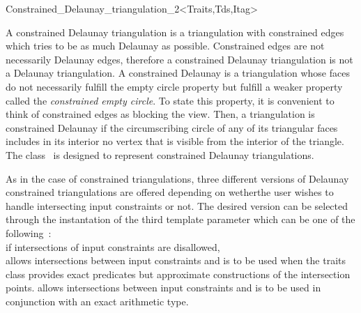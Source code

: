 

\begin{ccRefClass}{Constrained_Delaunay_triangulation_2<Traits,Tds,Itag>}  %


\ccDefinition
A constrained Delaunay triangulation is a triangulation with
constrained edges which tries to be as much Delaunay as possible.
Constrained edges are not necessarily Delaunay edges,
therefore a constrained Delaunay triangulation is not a Delaunay
triangulation. A constrained Delaunay is a triangulation
whose faces do not
necessarily fulfill the empty circle property
but fulfill a weaker property called the
{\em constrained empty circle}.
 To state this property,
it is convenient to think of  constrained
edges as blocking the view. Then, a triangulation is 
constrained Delaunay if
 the circumscribing circle
of any of its triangular faces includes in its interior 
no vertex  that is visible
from the interior of the triangle.  
The class \ccRefName\ is designed to represent
constrained Delaunay triangulations.

As in the case of constrained triangulations, three different versions
of Delaunay constrained triangulations are offered
depending on wetherthe user wishes to handle
intersecting input constraints or not.
The desired version can  be selected through the instantation of the
third template parameter  which can be one of the
following~: \\
 if  intersections of
 input constraints are disallowed,\\
 allows intersections between input
constraints
 and is to be used when the traits
class
provides exact predicates but approximate constructions of the
intersection points.
 allows intersections between input
constraints
 and is to be used in conjunction
with an exact arithmetic type.



\end{ccRefClass}
